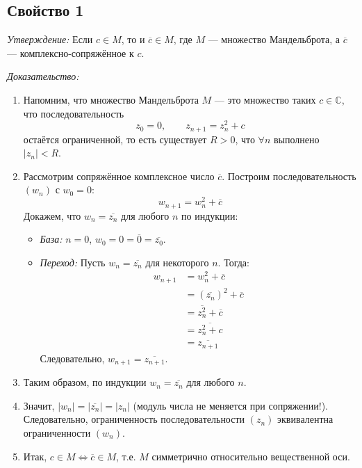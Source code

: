 \begin{section_1}

\subsection{Свойство 1}
\textit{Утверждение:} Если $c \in M$, то и $\overline{c} \in M$, где $M$ — множество Мандельброта, а $\overline{c}$ — комплексно-сопряжённое к $c$.


\textit{Доказательство:}

\begin{enumerate}
    \item Напомним, что множество Мандельброта $M$ — это множество таких $c \in \mathbb{C}$, что последовательность
    \[
        z_0 = 0,\qquad z_{n+1} = z_n^2 + c
    \]
    остаётся ограниченной, то есть существует $R > 0$, что $\forall n$ выполнено $|z_n| < R$.
    \item Рассмотрим сопряжённое комплексное число $\overline{c}$. Построим последовательность $(w_n)$ с $w_0=0$:
    \[
        w_{n+1} = w_n^2 + \overline{c}
    \]
    Докажем, что $w_n = \overline{z_n}$ для любого $n$ по индукции:
    \begin{itemize}
        \item \textit{База:} $n=0$, $w_0 = 0 = \overline{0} = \overline{z_0}$.
        \item \textit{Переход:} Пусть $w_n = \overline{z_n}$ для некоторого $n$. Тогда:
        \begin{align*}
            w_{n+1} &= w_n^2 + \overline{c} \\
                    &= (\overline{z_n})^2 + \overline{c} \\
                    &= \overline{z_n^2} + \overline{c} \\
                    &= \overline{z_n^2 + c} \\
                    &= \overline{z_{n+1}}
        \end{align*}
        Следовательно, $w_{n+1} = \overline{z_{n+1}}$.
    \end{itemize}
    \item Таким образом, по индукции $w_n = \overline{z_n}$ для любого $n$.
    \item Значит, $|w_n| = |\overline{z_n}| = |z_n|$ (модуль числа не меняется при сопряжении!). Следовательно, ограниченность последовательности $(z_n)$ эквивалентна ограниченности $(w_n)$.
    \item Итак, $c \in M \iff \overline{c} \in M$, т.е. $M$ симметрично относительно вещественной оси.
\end{enumerate}


\end{section_1}
